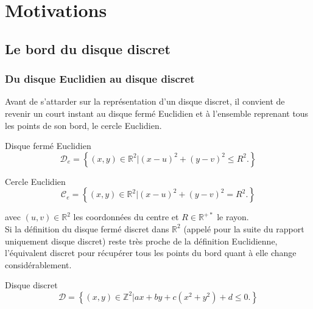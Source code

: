 \section{Motivations}

\subsection{Le bord du disque discret}

\subsubsection{Du disque Euclidien au disque discret}

Avant de s'attarder sur la représentation d'un disque discret, il convient de revenir un court instant au disque fermé Euclidien et à l'ensemble reprenant tous les points de son bord, le cercle Euclidien.




\begin{Definition}{Disque fermé Euclidien}
\label{def:disk-euc}
 $$\mathcal{D}_e =  \left\{ (x,y) \in \mathbb{R}^{2} |  (x - u)^2 + (y - v)^2 \leq R^2. \right\}$$
\end{Definition}

\begin{Definition}{Cercle Euclidien}
\label{def:cer-euc}
  $$\mathcal{C}_e =  \left\{ (x,y) \in \mathbb{R}^{2} |  (x - u)^2 + (y - v)^2 = R^2. \right\}$$
\end{Definition}


avec $(u,v) \in \mathbb{R}^{2}$ les coordonnées du centre et $R \in \mathbb{R}^{+*}$ le rayon.\\


Si la définition du disque fermé discret dans $\mathbb{R}^{2}$ (appelé pour la suite du rapport uniquement disque discret) reste très proche de la définition Euclidienne, l'équivalent discret pour récupérer tous les points du bord quant à elle change considérablement.

\begin{Definition}{Disque discret}
\label{def:disk-dis}
$$\mathcal{D} =  \left\{ (x,y) \in \mathbb{Z}^{2} |  ax + by + c(x^2 + y^2) + d \leq 0. \right\}$$
\end{Definition}

